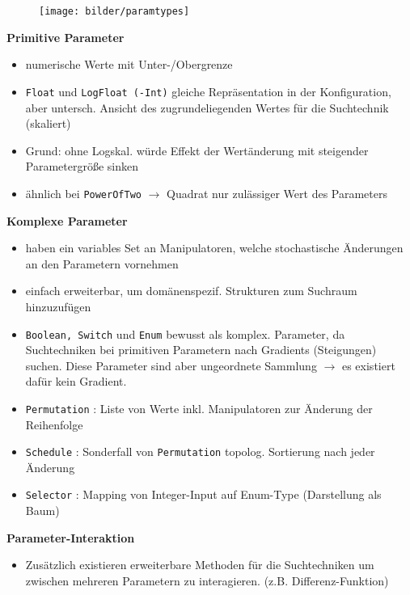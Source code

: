   \begin{frame}
      \begin{figure}[ht]
      \centering	      
      \texttt{[image: bilder/paramtypes]}
      \label{paramtypes}
    \end{figure}
    
  \textbf{Primitive Parameter}
  \begin{itemize}
    \item numerische Werte mit Unter-/Obergrenze
    \item \texttt{Float} und \texttt{LogFloat (-Int)} gleiche Repräsentation in der Konfiguration, aber 
    untersch. Ansicht des zugrundeliegenden Wertes für die Suchtechnik (skaliert)
    \item Grund: ohne Logskal. würde Effekt der Wertänderung mit steigender Parametergröße sinken
    \item ähnlich bei \texttt{PowerOfTwo} $\rightarrow$ Quadrat nur zulässiger Wert des Parameters
  \end{itemize}
  \end{frame}
  
  \begin{frame}
    \textbf{Komplexe Parameter}
    \begin{itemize}
      \item haben ein variables Set an Manipulatoren, welche stochastische Änderungen an den Parametern 
      vornehmen
      \item einfach erweiterbar, um domänenspezif. Strukturen zum Suchraum hinzuzufügen
      \item \texttt{Boolean, Switch} und \texttt{Enum} bewusst als komplex. Parameter, da Suchtechniken
      bei primitiven Parametern nach Gradients (Steigungen) suchen. Diese Parameter sind aber ungeordnete
      Sammlung $\rightarrow$ es existiert dafür kein Gradient.
      \item \texttt{Permutation} : Liste von Werte inkl. Manipulatoren zur Änderung der Reihenfolge
      \item \texttt{Schedule} : Sonderfall von \texttt{Permutation} topolog. Sortierung nach jeder Änderung
      \item \texttt{Selector} : Mapping von Integer-Input auf Enum-Type (Darstellung als Baum)
    \end{itemize}
    
    \textbf{Parameter-Interaktion}
    \begin{itemize}
      \item Zusätzlich existieren erweiterbare Methoden für die Suchtechniken um zwischen mehreren Parametern 
    zu interagieren. (z.B. Differenz-Funktion)
    \end{itemize}
  \end{frame}
    

